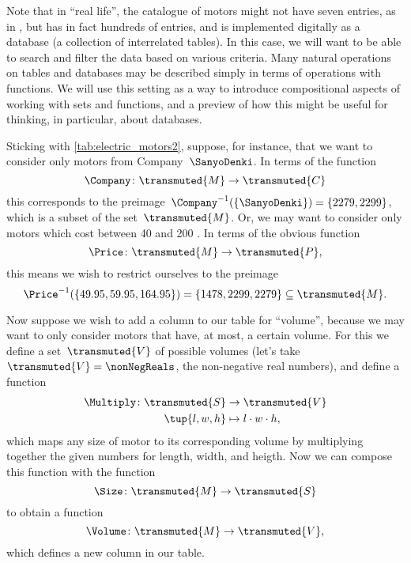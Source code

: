 Note that in ``real life'', the catalogue of motors might not have seven entries, as in \XXX, but has in fact hundreds of entries, and is implemented digitally as a database (a collection of interrelated tables).
In this case, we will want to be able to search and filter the data based on various criteria.
Many natural operations on tables and databases may be described simply in terms of operations with functions.
We will use this setting as a way to introduce compositional aspects of working with sets and functions, and a preview of how this might be useful for thinking, in particular, about databases.

Sticking with \cref{tab:electric_motors2}, suppose, for instance, that we want to consider only motors from Company~$\SanyoDenki$.
In terms of the function
\begin{equation*}
    \Company\colon \transmuted{M} \to \transmuted{C}
\end{equation*}
this corresponds to the preimage~$\Company^{-1}(\{\SanyoDenki \}) = \{2279, 2299\}$, which is a subset of the set~$\transmuted{M}$.
Or, we may want to consider only motors which cost between 40 and 200 \USD.
In terms of the obvious function
\begin{equation*}
    \Price\colon \transmuted{M} \to \transmuted{P},
\end{equation*}
this means we wish to restrict ourselves to the preimage
\begin{equation*}
    \Price^{-1}(\{ 49.95, 59.95, 164.95\}) = \{ 1478, 2299, 2279 \} \subseteq \transmuted{M}.
\end{equation*}
%

Now suppose we wish to add a column to our table for ``volume'', because we may want to only consider motors that have, at most, a certain volume.
For this we define a set~$\transmuted{V}$ of possible volumes (let's take~$\transmuted{V} = \nonNegReals$, the non-negative real numbers), and define a function
\begin{equation*}
    \begin{aligned}
        \Multiply \colon \transmuted{S} & \to \transmuted{V}         \\
        \tup{l, w, h}                   & \mapsto l \cdot w \cdot h,
    \end{aligned}
\end{equation*}
which maps any size of motor to its corresponding volume by multiplying together the given numbers for length, width, and heigth.
Now we can compose this function with the function
\begin{equation*}
    \Size \colon \transmuted{M} \to \transmuted{S}
\end{equation*}
to obtain a function
\begin{equation*}
    \Volume\colon \transmuted{M} \to \transmuted{V},
\end{equation*}
which defines a new column in our table.

